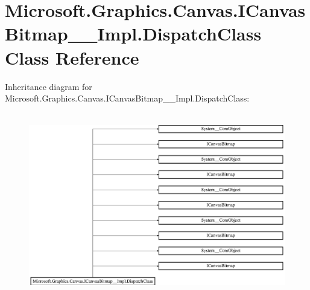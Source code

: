 \hypertarget{class_microsoft_1_1_graphics_1_1_canvas_1_1_i_canvas_bitmap_____impl_1_1_dispatch_class}{}\section{Microsoft.\+Graphics.\+Canvas.\+I\+Canvas\+Bitmap\+\_\+\+\_\+\+Impl.\+Dispatch\+Class Class Reference}
\label{class_microsoft_1_1_graphics_1_1_canvas_1_1_i_canvas_bitmap_____impl_1_1_dispatch_class}
Inheritance diagram for Microsoft.\+Graphics.\+Canvas.\+I\+Canvas\+Bitmap\+\_\+\+\_\+\+Impl.\+Dispatch\+Class\+:\begin{figure}[H]
\begin{center}
\leavevmode
\includegraphics[height=8.062827cm]{class_microsoft_1_1_graphics_1_1_canvas_1_1_i_canvas_bitmap_____impl_1_1_dispatch_class}
\end{center}
\end{figure}
